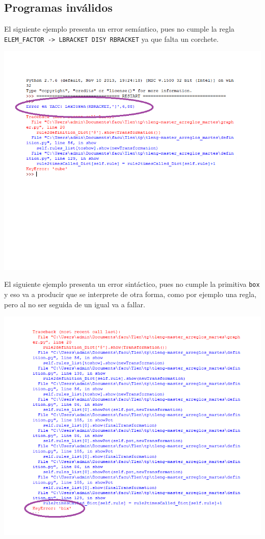 \newpage

\subsection{Programas inv\'alidos}

El siguiente ejemplo presenta un error sem\'antico, pues no cumple la regla \texttt{ELEM\_FACTOR -> LBRACKET DISY RBRACKET} ya que falta un corchete. \\



\centerline{\includegraphics[scale=0.70]{../imagenes/eg22invalid.png}}


El siguiente ejemplo presenta un error sint\'actico, pues no cumple la primitiva \texttt{box} y eso va a producir que se interprete de otra forma, como por ejemplo una regla, pero al no ser seguida de un igual va a fallar.\\



\centerline{\includegraphics[scale=0.70]{../imagenes/eg22invalid2.png}}

